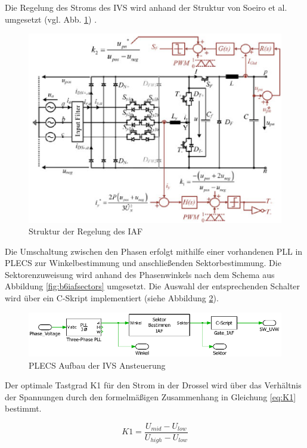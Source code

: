 		
		Die Regelung des Stroms des IVS wird anhand der Struktur von Soeiro et al. umgesetzt (vgl. Abb. \ref{fig:iafpapercontrol}) \cite{Soeiro.2013}. 
		 \begin{figure}
			\centering
			\includegraphics[width=0.8\linewidth]{content/Grafiken/IAF_Paper_Control}
			\caption{Struktur der Regelung des IAF \cite{Soeiro.2013}}
			\label{fig:iafpapercontrol}
		\end{figure}
		Die Umschaltung zwischen den Phasen erfolgt mithilfe einer vorhandenen PLL in PLECS zur Winkelbestimmung und anschließenden Sektorbestimmung. Die Sektorenzuweisung wird anhand des Phasenwinkels nach dem Schema aus Abbildung \ref{fig:b6iafsectors} umgesetzt. Die Auswahl der entsprechenden Schalter wird über ein C-Skript implementiert (siehe Abbildung \ref{fig:plecsiafivscontrol}). 
		\begin{figure}
			\centering
			\includegraphics[width=1\linewidth]{content/Grafiken/PlecsIAFivscontrol}
			\caption{PLECS Aufbau der \gls{IVS} Ansteuerung}
			\label{fig:plecsiafivscontrol}
		\end{figure}
		Der optimale Tastgrad K1 für den Strom in der Drossel wird über das Verhältnis der Spannungen durch den formelmäßigen Zusammenhang in Gleichung \ref{eq:K1} bestimmt. 
		

		
		\begin{equation}
			\label{eq:K1}
			K1 = \dfrac{U_{mid}- U_{low}}{U_{high} -U_{low}} 
		\end{equation}
		
